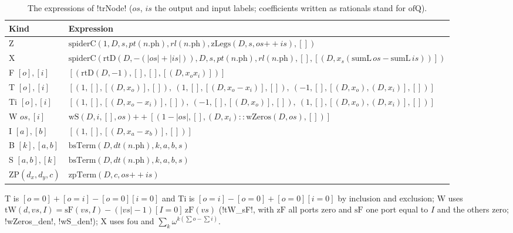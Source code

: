 \begin{table}[H]
\centering\small
\begin{tabularx}{\linewidth}{@{}l>{\raggedright\arraybackslash}X@{}}
\toprule
Kind & Expression \\
\midrule
Z & $\mathrm{spiderC}(1,D,s,\mathit{pt}(n.\mathrm{ph}),\mathit{rl}(n.\mathrm{ph}),\mathrm{zLegs}(D,s,os\mathbin{+\!\!+}is),[])$ \\
X & $\mathrm{spiderC}(\mathrm{rtD}(D,-(|os|+|is|)),D,s,\mathit{pt}(n.\mathrm{ph}),\mathit{rl}(n.\mathrm{ph}),[],[(D,x_s(\mathrm{sumL}\,os-\mathrm{sumL}\,is))])$ \\
F $[o],[i]$ & $[(\mathrm{rtD}(D,-1),[],[],[(D,x_ox_i)])]$ \\
T $[o],[i]$ & $[(1,[],[(D,x_o)],[]),\ (1,[],[(D,x_o-x_i)],[]),\ (-1,[],[(D,x_o),(D,x_i)],[])]$ \\
Ti $[o],[i]$ & $[(1,[],[(D,x_o-x_i)],[]),\ (-1,[],[(D,x_o)],[]),\ (1,[],[(D,x_o),(D,x_i)],[])]$ \\
W $os,[i]$ & $\mathrm{wS}(D,i,[],os)\mathbin{+\!\!+}[(1-|os|,[],(D,x_i)\mathbin{::}\mathrm{wZeros}(D,os),[])]$ \\
I $[a],[b]$ & $[(1,[],[(D,x_a-x_b)],[])]$ \\
B $[k],[a,b]$ & $\mathrm{bsTerm}(D,\mathit{dt}(n.\mathrm{ph}),k,a,b,s)$ \\
S $[a,b],[k]$ & $\mathrm{bsTerm}(D,\mathit{dt}(n.\mathrm{ph}),k,a,b,s)$ \\
ZP$(d_x,d_y,c)$ & $\mathrm{zpTerm}(D,c,os\mathbin{+\!\!+}is)$ \\
\bottomrule
\end{tabularx}
\caption{The expressions of \lean!trNode! ($os$, $is$ the output and input labels; coefficients written as rationals stand for $\mathrm{ofQ}$).}\label{tab:lean-sym-trnode}
\end{table}

T is $[o=0]+[o=i]-[o=0][i=0]$ and Ti is $[o=i]-[o=0]+[o=0][i=0]$ by inclusion and exclusion; W uses $\mathrm{tW}(d,vs,I)=\mathrm{sF}(vs,I)-(|vs|-1)[I=0]\,\mathrm{zF}(vs)$ (\lean!tW_sF!, with $\mathrm{zF}$ all ports zero and $\mathrm{sF}$ one port equal to $I$ and the others zero; \lean!wZeros_den!, \lean!wS_den!); X uses $\mathrm{fou}$ and $\sum_k\omega^{k(\sum o-\sum i)}$.

